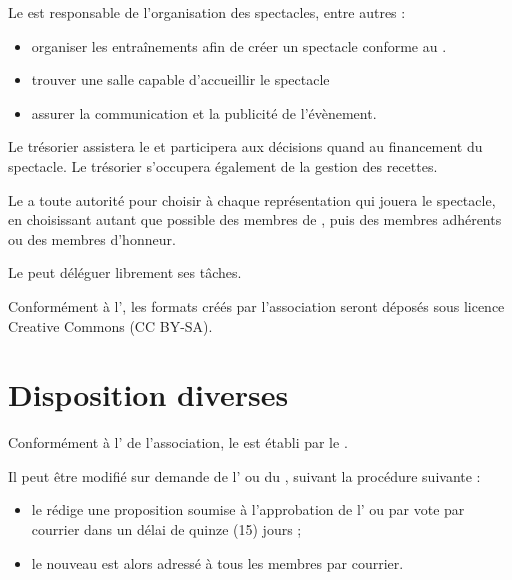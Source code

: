 \label{sec:spectacles}
Le \DA{} est responsable de l'organisation des spectacles, entre autres :
\begin{itemize}
\item organiser les entraînements afin de créer un spectacle conforme au \PA{}.
\item trouver une salle capable d'accueillir le spectacle
\item assurer la communication et la publicité de l'évènement.
\end{itemize}

Le trésorier assistera le \DA{} et participera aux décisions quand au financement du spectacle. Le trésorier s'occupera également de la gestion des recettes.

Le \DA{} a toute autorité pour choisir à chaque représentation qui jouera le spectacle, en choisissant autant que possible des membres de \troupe{}, puis des membres adhérents ou des membres d'honneur.

Le \DA{} peut déléguer librement ses tâches.

\label{sec:licence-des-formats}
Conformément à l', les formats créés par l'association seront déposés sous licence Creative Commons (CC BY-SA).


\section{Disposition diverses}
\label{sec:reglement-interieur}
Conformément à l' de l'association, le \RI{} est établi par le \bureau{}.

Il peut être modifié sur demande de l'\AG{} ou du \bureau{}, suivant la procédure suivante :
\begin{itemize}
\item le \bureau{} rédige une proposition soumise à l'approbation de l'\AG{} ou par vote par courrier dans un délai de quinze (15) jours ;
\item le nouveau \RI{} est alors adressé à tous les membres par courrier.
\end{itemize}

